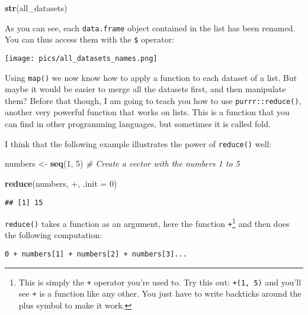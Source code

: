\documentclass[
]{article}
\newenvironment{Shaded}{\begin{snugshade}}{\end{snugshade}}
\newcommand{\CommentTok}[1]{\textcolor[rgb]{0.56,0.35,0.01}{\textit{#1}}}
\newcommand{\DataTypeTok}[1]{\textcolor[rgb]{0.13,0.29,0.53}{#1}}
\newcommand{\DecValTok}[1]{\textcolor[rgb]{0.00,0.00,0.81}{#1}}
\newcommand{\KeywordTok}[1]{\textcolor[rgb]{0.13,0.29,0.53}{\textbf{#1}}}
\newcommand{\NormalTok}[1]{#1}
\newcommand{\StringTok}[1]{\textcolor[rgb]{0.31,0.60,0.02}{#1}}
\begin{document}
\begin{Shaded}
\begin{Highlighting}[]
\KeywordTok{str}\NormalTok{(all\_datasets)}
\end{Highlighting}
\end{Shaded}

As you can see, each \texttt{data.frame} object contained in the list has been renamed. You can thus
access them with the \texttt{\$} operator:

\texttt{[image: pics/all\_datasets\_names.png]}

Using \texttt{map()} we now know how to apply a function to each dataset of a list. But maybe it would be
easier to merge all the datasets first, and then manipulate them? Before that though, I am going to
teach you how to use \texttt{purrr::reduce()}, another very powerful function that works on lists. This is
a function that you can find in other programming languages, but sometimes it is called fold.

I think that the following example illustrates the power of \texttt{reduce()} well:

\begin{Shaded}
\begin{Highlighting}[]
\NormalTok{numbers \textless{}{-}}\StringTok{ }\KeywordTok{seq}\NormalTok{(}\DecValTok{1}\NormalTok{, }\DecValTok{5}\NormalTok{) }\CommentTok{\# Create a vector with the numbers 1 to 5}

\KeywordTok{reduce}\NormalTok{(numbers, }\StringTok{\textasciigrave{}}\DataTypeTok{+}\StringTok{\textasciigrave{}}\NormalTok{, }\DataTypeTok{.init =} \DecValTok{0}\NormalTok{)}
\end{Highlighting}
\end{Shaded}

\begin{verbatim}
## [1] 15
\end{verbatim}

\texttt{reduce()} takes a function as an argument, here the function \texttt{+}\footnote{This is simply the \texttt{+} operator
  you're used to. Try this out: \texttt{\textasciigrave{}+\textasciigrave{}(1,\ 5)} and you'll see \texttt{+} is a function like any other. You
  just have to write backticks around the plus symbol to make it work.} and then does the following
computation:

\begin{verbatim}
0 + numbers[1] + numbers[2] + numbers[3]...
\end{verbatim}
\end{document}
